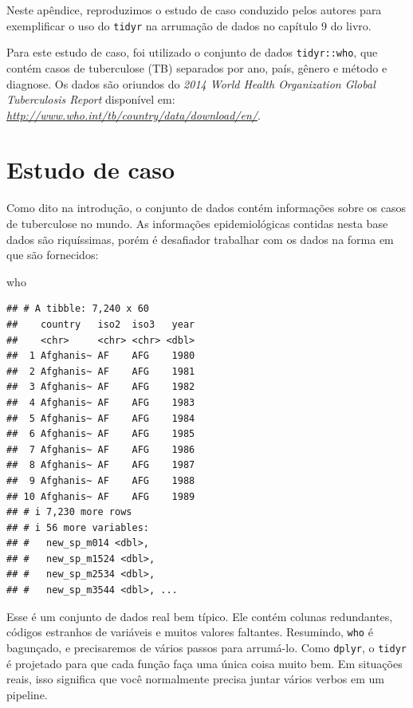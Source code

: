 \documentclass[
]{latex/krantz}
\newenvironment{Shaded}{\begin{snugshade}}{\end{snugshade}}
\newcommand{\NormalTok}[1]{#1}
\theoremstyle{definition}
\theoremstyle{definition}
\theoremstyle{definition}
\theoremstyle{definition}
\theoremstyle{remark}
\begin{document}
Neste apêndice, reproduzimos o estudo de caso conduzido pelos autores para exemplificar o uso do \texttt{tidyr} na arrumação de dados no capítulo 9 do livro.

Para este estudo de caso, foi utilizado o conjunto de dados \texttt{tidyr::who}, que contém casos de tuberculose (TB) separados por ano, país, gênero e método e diagnose. Os dados são oriundos do \emph{2014 World Health Organization Global Tuberculosis Report} disponível em: \emph{\url{http://www.who.int/tb/country/data/download/en/}}.

\hypertarget{estudo-de-caso-1}{%
\section*{Estudo de caso}\label{estudo-de-caso-1}}

Como dito na introdução, o conjunto de dados contém informações sobre os casos de tuberculose no mundo. As informações epidemiológicas contidas nesta base dados são riquíssimas, porém é desafiador trabalhar com os dados na forma em que são fornecidos:

\begin{Shaded}
\begin{Highlighting}[]
\NormalTok{who}
\end{Highlighting}
\end{Shaded}

\begin{verbatim}
## # A tibble: 7,240 x 60
##    country   iso2  iso3   year
##    <chr>     <chr> <chr> <dbl>
##  1 Afghanis~ AF    AFG    1980
##  2 Afghanis~ AF    AFG    1981
##  3 Afghanis~ AF    AFG    1982
##  4 Afghanis~ AF    AFG    1983
##  5 Afghanis~ AF    AFG    1984
##  6 Afghanis~ AF    AFG    1985
##  7 Afghanis~ AF    AFG    1986
##  8 Afghanis~ AF    AFG    1987
##  9 Afghanis~ AF    AFG    1988
## 10 Afghanis~ AF    AFG    1989
## # i 7,230 more rows
## # i 56 more variables:
## #   new_sp_m014 <dbl>,
## #   new_sp_m1524 <dbl>,
## #   new_sp_m2534 <dbl>,
## #   new_sp_m3544 <dbl>, ...
\end{verbatim}

Esse é um conjunto de dados real bem típico. Ele contém colunas redundantes, códigos estranhos de variáveis e muitos valores faltantes. Resumindo, \texttt{who} é bagunçado, e precisaremos de vários passos para arrumá-lo. Como \texttt{dplyr}, o \texttt{tidyr} é projetado para que cada função faça uma única coisa muito bem. Em situações reais, isso significa que você normalmente precisa juntar vários verbos em um pipeline.
\end{document}
